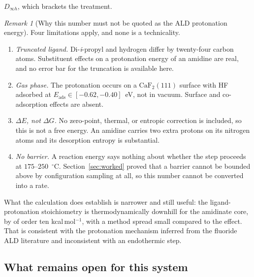 \documentclass[11pt,a4paper]{article}
\theoremstyle{plain}
\theoremstyle{definition}
\theoremstyle{remark}
\newtheorem{remark}[theorem]{Remark}
\begin{document}
$D_{\infty h}$, which brackets
the treatment.

\begin{remark}[Why this number must not be quoted as the ALD protonation energy]
Four limitations apply, and none is a technicality.
\begin{enumerate}
\item \emph{Truncated ligand.} Di-\emph{i}-propyl and hydrogen differ by
twenty-four carbon atoms. Substituent effects on a protonation energy of an
amidine are real, and no error bar for the truncation is available here.
\item \emph{Gas phase.} The protonation occurs on a $\mathrm{CaF_2}(111)$ surface
with HF adsorbed at $E_{\mathrm{ads}} \in[-0.62,-0.40]$~eV, not in vacuum. Surface
and co-adsorption effects are absent.
\item \emph{$\Delta E$, not $\Delta G$.} No zero-point, thermal, or entropic
correction is included, so this is not a free energy. An amidine carries two extra
protons on its nitrogen atoms and its desorption entropy is substantial.
\item \emph{No barrier.} A reaction energy says nothing about whether the step
proceeds at $175$--$250$~$^\circ$C. Section~\ref{sec:worked} proved that a barrier
cannot be bounded above by configuration sampling at all, so this number cannot be
converted into a rate.
\end{enumerate}
What the calculation does establish is narrower and still useful: the
ligand-protonation stoichiometry is thermodynamically downhill for the amidinate
core, by of order ten kcal\,mol$^{-1}$, with a method spread small compared to the
effect. That is consistent with the protonation mechanism inferred from the
fluoride ALD literature and inconsistent with an endothermic step.
\end{remark}

\subsection{What remains open for this system}
\end{document}

